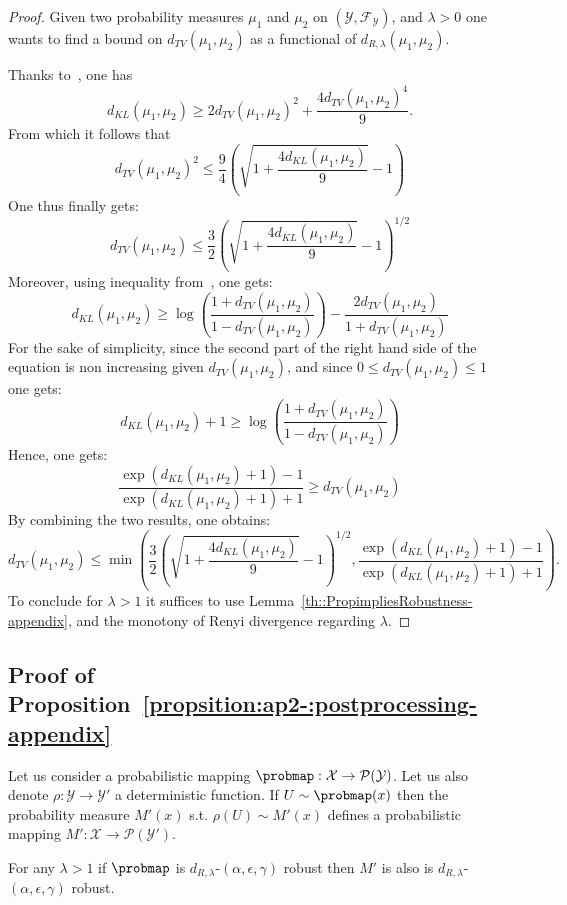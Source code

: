 \begin{proof}
Given two probability measures $\mu_1$ and $\mu_2$ on $(\mathcal{Y},\mathcal{F}_{\mathcal{Y}})$, and $\lambda >0$ one wants to find a bound on $d_{TV}(\mu_1,\mu_2)$ as a functional of $d_{R,\lambda}(\mu_1,\mu_2)$. 

Thanks to~\cite{5605338}, one has $$ d_{KL}(\mu_1,\mu_2) \geq 2d_{TV}(\mu_1,\mu_2)^{2}+ \frac{4d_{TV}(\mu_1,\mu_2)^{4}}{9}. $$ From which it follows that $$d_{TV}(\mu_1,\mu_2)^{2} \leq \frac{9}{4}\left(\sqrt{1 + \frac{4d_{KL}(\mu_1,\mu_2)}{9}} - 1\right)$$
One thus finally gets: 
$$d_{TV}(\mu_1,\mu_2) \leq \frac{3}{2}\left(\sqrt{1 + \frac{4d_{KL}(\mu_1,\mu_2)}{9}} - 1\right)^{1/2}$$
Moreover, using inequality from~\cite{Vajda1970}, one gets:
$$d_{KL}(\mu_1,\mu_2) \geq \log\left(\frac{1 + d_{TV}(\mu_1,\mu_2)}{1 - d_{TV}(\mu_1,\mu_2)} \right) - \frac{2d_{TV}(\mu_1,\mu_2)}{1 + d_{TV}(\mu_1,\mu_2)}$$
For the sake of simplicity, since the second part of the right hand side of the equation is non increasing given $d_{TV}(\mu_1,\mu_2)$, and since $0\leq d_{TV}(\mu_1,\mu_2)\leq 1$  one gets:
$$d_{KL}(\mu_1,\mu_2) +1 \geq \log\left(\frac{1 + d_{TV}(\mu_1,\mu_2)}{1 - d_{TV}(\mu_1,\mu_2)} \right) $$
Hence, one gets:
$$ \frac{\exp(d_{KL}(\mu_1,\mu_2) +1) -1}{\exp(d_{KL}(\mu_1,\mu_2) +1) +1} \geq  d_{TV}(\mu_1,\mu_2) $$
By combining the two results, one obtains: $$ d_{TV}(\mu_1,\mu_2) \leq \min \left(\frac{3}{2}\left(\sqrt{1 + \frac{4 d_{KL}(\mu_1,\mu_2)}{9}} - 1\right)^{1/2}, \frac{\exp(d_{KL}(\mu_1,\mu_2) +1) -1}{\exp(d_{KL}(\mu_1,\mu_2) +1) +1} \right).$$
To conclude for $\lambda>1$ it suffices to use Lemma~\ref{th::PropimpliesRobustness-appendix}, and the monotony of Renyi divergence regarding $\lambda$.
\end{proof}

\subsection{Proof of Proposition~\ref{propsition:ap2-:postprocessing-appendix}}


\begin{proposition}
\label{propsition:ap2-:postprocessing-appendix} 
Let us consider a probabilistic mapping $\probmap:\mathcal{X}\rightarrow\mathcal{P}(\mathcal{Y})$. Let us also denote $\rho:\mathcal{Y}\rightarrow\mathcal{Y}'$ a deterministic function.
If $U\sim \probmap(x)$ then the probability measure $M'(x)$ s.t. $\rho(U) \sim M'(x)$ defines a probabilistic mapping $M':\mathcal{X}\rightarrow\mathcal{P}(\mathcal{Y}')$.

For any $\lambda>1$ if $\probmap$ is $d_{R,\lambda}$-$(\alpha,\epsilon,\gamma)$ robust then $M'$ is also is $d_{R,\lambda}$-$(\alpha,\epsilon,\gamma)$ robust.
\end{proposition}

